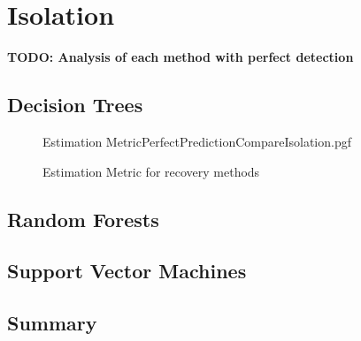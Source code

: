 \chapter{Isolation}
\label{chap:Isolation}

\textbf{TODO: Analysis of each method with perfect detection}

\section{Decision Trees}

\begin{figure}[!htb]
	\centering
	{Estimation MetricPerfectPredictionCompareIsolation.pgf}
	
	\caption{Estimation Metric for recovery methods}
	\label{fig:RecoveryComparisonMagnetic}
\end{figure}

\section{Random Forests}

\section{Support Vector Machines}

\section{Summary}